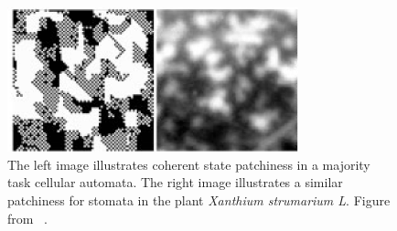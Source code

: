 \documentclass[a4paper,11pt]{article}
\begin{document}
\begin{figure}[htp]
	\centering
	\includegraphics[width=0.75\textwidth]{me07_fig3_ca_stoma_comparison.png}
	\caption[Qualitative CA-Stomata Comparison]{
	The left image illustrates coherent state patchiness in a majority task cellular automata. The right image illustrates a similar patchiness for stomata in the plant \textit{Xanthium strumarium L}. Figure from \citeauthor{me07}~\cite{me07}.
	}
	\label{fig:ca_stoma}
\end{figure}

\end{document}
